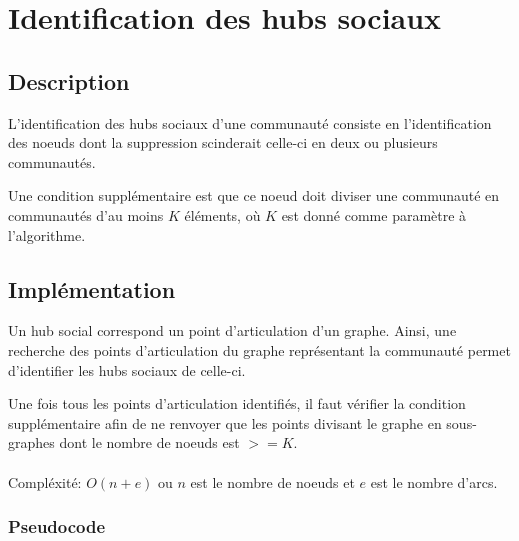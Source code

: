 \documentclass[12pt, oneside]{article}
\begin{document}
\FloatBarrier
\section{Identification des hubs sociaux}
\subsection{Description}
L'identification des hubs sociaux d'une communauté consiste en l'identification des noeuds dont la suppression scinderait celle-ci en deux ou plusieurs communautés.

Une condition supplémentaire est que ce noeud doit diviser une communauté en communautés d'au moins $K$ éléments, où $K$ est donné comme paramètre à l'algorithme.

\subsection{Implémentation}

Un hub social correspond un point d'articulation d'un graphe. 
Ainsi, une recherche des points d'articulation du graphe représentant la communauté permet d'identifier les hubs sociaux de celle-ci.

Une fois tous les points d'articulation identifiés, il faut vérifier la condition supplémentaire afin de ne renvoyer que les points divisant le graphe en sous-graphes dont le nombre de noeuds est $>=K$.\\\\
Compléxité: $O(n+e)$ ou $n$ est le nombre de noeuds et $e$ est le nombre d'arcs.
\newpage
\subsubsection{Pseudocode}
\begin{algorithm}[H]
\end{algorithm}
\newpage
\FloatBarrier
\end{document}
